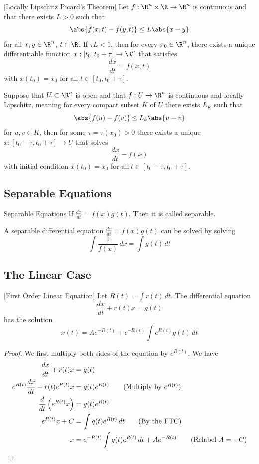 \documentclass[a4paper]{article}
\begin{document}
\begin{thm}{}{}[Locally Lipschitz Picard's Theorem] Let $f:\R^n\times\R\to\R^n$ is continuous and that there exists $L>0$ such that $$\abs{f(x,t)-f(y,t)}\leq L\abs{x-y}$$ for all $x,y\in\R^n$, $t\in\R$.  If $\tau L<1$, then for every $x_0\in\R^n$, there exists a unique differentiable function $x:[t_0,t_0+\tau]\to\R^n$ that satisfies $$\frac{dx}{dt}=f(x,t)$$ with $x(t_0)=x_0$ for all $t\in[t_0,t_0+\tau]$. 
\end{thm}

\begin{thm}{}{} Suppose that $U\subset\R^n$ is open and that $f:U\to\R^n$ is continuous and locally Lipschitz, meaning for every compact subset $K$ of $U$ there exists $L_K$ such that $$\abs{f(u)-f(v)}\leq L_k\abs{u-v}$$ for $u,v\in K$, then for some $\tau=\tau(x_0)>0$ there exists a unique $x:[t_0-\tau,t_0+\tau]\to U$ that solves $$\frac{dx}{dt}=f(x)$$ with initial condition $x(t_0)=x_0$ for all $t\in[t_0-\tau,t_0+\tau]$. 
\end{thm}

\subsection{Separable Equations}
\begin{defn}{Separable Equations}{} If $\frac{dx}{dt}=f(x)g(t)$. Then it is called separable. 
\end{defn}

\begin{lmm}{}{} A separable differential equation $\frac{dx}{dt}=f(x)g(t)$ can be solved by solving $$\int\frac{1}{f(x)}\,dx=\int g(t)\,dt$$
\end{lmm}

\subsection{The Linear Case}
\begin{thm}{}{}[First Order Linear Equation] Let $R(t)=\int r(t)\,dt$. The differential equation $$\frac{dx}{dt}+r(t)x=g(t)$$ has the solution $$x(t)=Ae^{-R(t)}+e^{-R(t)}\int e^{R(t)}g(t)\,dt$$
\end{thm}
\begin{proof} We first multiply both sides of the equation by $e^{R(t)}$. We have
\begin{align*}
\frac{dx}{dt}+r(t)x&=g(t)\\
e^{R(t)}\frac{dx}{dt}+r(t)e^{R(t)}x&=g(t)e^{R(t)}\tag{Multiply by $e^{R(t)}$}\\
\frac{d}{dt}\left(e^{R(t)}x\right)&=g(t)e^{R(t)}\\
e^{R(t)}x+C&=\int g(t)e^{R(t)}\,dt\tag{By the FTC}\\
x&=e^{-R(t)}\int g(t)e^{R(t)}\,dt+Ae^{-R(t)}\tag{Relabel $A=-C$}
\end{align*}
\end{proof}
\end{document}
